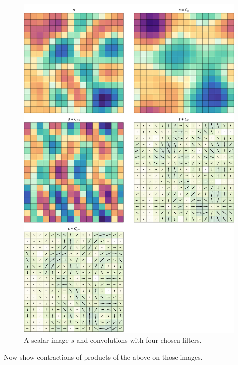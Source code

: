 \documentclass{article}
\theoremstyle{plain}
\begin{document}
\begin{figure}
  \begin{mdframed}
  \color{captiongray}
  \begin{center}
    \includegraphics[width=\textwidth]{notebooks/monomials_1.png}
  \end{center}
    \caption{A scalar image $s$ and convolutions with four chosen filters.}
  \end{mdframed}
\end{figure}

Now show contractions of products of the above on those images.
\end{document}
